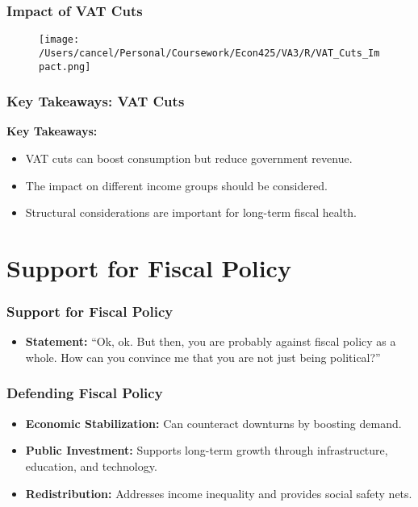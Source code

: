 \documentclass{beamer}
\begin{document}
\begin{frame}
    \frametitle{Impact of VAT Cuts}
    \begin{figure}[h!]
        \centering
        \texttt{[image: /Users/cancel/Personal/Coursework/Econ425/VA3/R/VAT\_Cuts\_Impact.png]}
    \end{figure}
\end{frame}

\begin{frame}
    \frametitle{Key Takeaways: VAT Cuts}
    \textbf{Key Takeaways:}
    \begin{itemize}
        \item VAT cuts can boost consumption but reduce government revenue.
        \item The impact on different income groups should be considered.
        \item Structural considerations are important for long-term fiscal health.
    \end{itemize}
\end{frame}

\section{Support for Fiscal Policy}

\begin{frame}
    \frametitle{Support for Fiscal Policy}
    \begin{itemize}
        \item \textbf{Statement:} ``Ok, ok. But then, you are probably against fiscal policy as a whole. How can you convince me that you are not just being political?''
    \end{itemize}
\end{frame}

\begin{frame}
    \frametitle{Defending Fiscal Policy}
    \begin{itemize}
        \item \textbf{Economic Stabilization:} Can counteract downturns by boosting demand.
        \item \textbf{Public Investment:} Supports long-term growth through infrastructure, education, and technology.
        \item \textbf{Redistribution:} Addresses income inequality and provides social safety nets.
    \end{itemize}
\end{frame}
\end{document}
